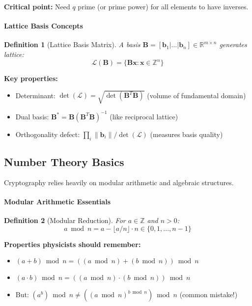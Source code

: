 \documentclass[11pt,a4paper]{article}
\newtheorem{definition}{Definition}
\begin{document}
\textbf{Critical point:} Need $q$ prime (or prime power) for all elements to have inverses.

\paragraph{Lattice Basis Concepts}

\begin{definition}[Lattice Basis Matrix]
A basis $\mathbf{B} = [\mathbf{b}_1 | ... | \mathbf{b}_n] \in \mathbb{R}^{m \times n}$ generates lattice:
$$\mathcal{L}(\mathbf{B}) = \{\mathbf{Bx} : \mathbf{x} \in \mathbb{Z}^n\}$$
\end{definition}

\textbf{Key properties:}
\begin{itemize}
    \item Determinant: $\det(\mathcal{L}) = \sqrt{\det(\mathbf{B}^T\mathbf{B})}$ (volume of fundamental domain)
    \item Dual basis: $\mathbf{B}^* = \mathbf{B}(\mathbf{B}^T\mathbf{B})^{-1}$ (like reciprocal lattice)
    \item Orthogonality defect: $\prod_i \|\mathbf{b}_i\| / \det(\mathcal{L})$ (measures basis quality)
\end{itemize}

\subsection{Number Theory Basics}
\label{app:number-theory}

Cryptography relies heavily on modular arithmetic and algebraic structures.

\paragraph{Modular Arithmetic Essentials}

\begin{definition}[Modular Reduction]
For $a \in \mathbb{Z}$ and $n > 0$:
$$a \bmod n = a - \lfloor a/n \rfloor \cdot n \in \{0, 1, ..., n-1\}$$
\end{definition}

\textbf{Properties physicists should remember:}
\begin{itemize}
    \item $(a + b) \bmod n = ((a \bmod n) + (b \bmod n)) \bmod n$
    \item $(a \cdot b) \bmod n = ((a \bmod n) \cdot (b \bmod n)) \bmod n$
    \item But: $(a^b) \bmod n \neq ((a \bmod n)^{b \bmod n}) \bmod n$ (common mistake!)
\end{itemize}
\end{document}
